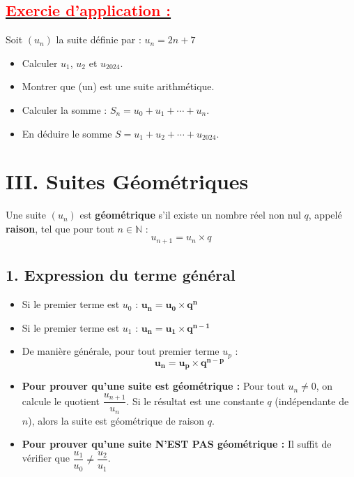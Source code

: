 \documentclass[12pt,a4paper]{article}
\begin{document}
\subsection*{\underline{\textbf{\textcolor{red}{Exercie d'application :}}}}
Soit $\left(u_{n}\right)$ la suite définie par : $u_{n}=2n+7$
\begin{itemize}
\item[1.]Calculer $u_{1}$, $u_{2}$ et $u_{2024}.$
\item[2.] Montrer que (un) est une suite arithmétique.
\item[3.] Calculer la somme : $S_{n} = u_{0} + u_{1} + \cdots+ u_{n}.$
\item[4.] En déduire le somme $S = u_{1} + u_{2} +\cdots+ u_{2024}.$
\end{itemize}

\section*{\color{myred}III. Suites Géométriques}

\begin{tcolorbox}[colback=red!5!white,colframe=myred,title=\textbf{Définition}]
Une suite $(u_n)$ est \textbf{géométrique} s'il existe un nombre réel non nul $q$, appelé \textbf{raison}, tel que pour tout $n \in \mathbb{N}$ :
\[
u_{n+1} = u_n \times q
\]
\end{tcolorbox}

\subsection*{\color{myred}1. Expression du terme général}
\begin{itemize}[label=$\bullet$]
    \item Si le premier terme est $u_0$ : $\mathbf{u_n = u_0 \times q^n}$
    \item Si le premier terme est $u_1$ : $\mathbf{u_n = u_1 \times q^{n-1}}$
    \item De manière générale, pour tout premier terme $u_p$ :
    \[
    \mathbf{u_n = u_p \times q^{n-p}}
    \]
\end{itemize}

\begin{tcolorbox}[colback=green!5!white,colframe=mygreen,title=\textbf{Méthode : Démontrer la nature d'une suite}]
\begin{itemize}
    \item \textbf{Pour prouver qu'une suite est géométrique :} Pour tout $u_n \neq 0$, on calcule le quotient $\dfrac{u_{n+1}}{u_n}$. Si le résultat est une constante $q$ (indépendante de $n$), alors la suite est géométrique de raison $q$.
    \item \textbf{Pour prouver qu'une suite N'EST PAS géométrique :} Il suffit de vérifier que $\dfrac{u_1}{u_0} \neq \dfrac{u_2}{u_1}$.
\end{itemize}
\end{tcolorbox}
\end{document}

